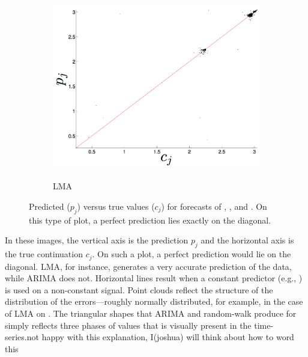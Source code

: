 \begin{figure}[htbp]
\begin{subfigure}{0.6\columnwidth}
    \includegraphics[width=\columnwidth]{figs/svdfiveLMAForecast.png}
    \caption{\svdfive \\ LMA}
    \label{fig:gccLMA}
  \end{subfigure}
   \caption{Predicted ($p_j$) versus true values ($c_j$) for
     forecasts of \col, \gcc, and \svdfive.  On this type of plot, a
     perfect prediction lies exactly on the diagonal.
%
%
}
\label{fig:forecast-example}
\end{figure} 
In these images, the vertical axis is the prediction $p_j$ and the
horizontal axis is the true continuation $c_j$.  On such a plot, a
perfect prediction would lie on the diagonal.  LMA, for instance,
generates a very accurate prediction of the \col data, while ARIMA
does not.  Horizontal lines result when a constant predictor (e.g.,
\naive) is used on a non-constant signal.  Point clouds reflect the
structure of the distribution of the errors---roughly normally
distributed, for example, in the case of LMA on \gcc. The triangular 
shapes that ARIMA and random-walk produce for \col simply reflects 
three phases of values that is visually present in the time-series.{\color{red}not happy with this explanation, I(joshua) will think about how to word this}


